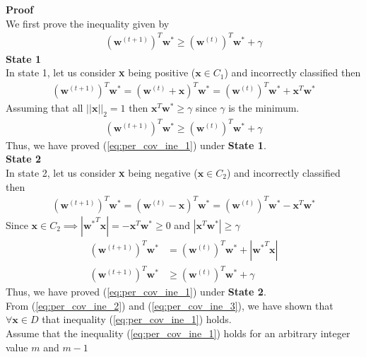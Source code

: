 \textbf{Proof}\\
We first prove the inequality given by 
\begin{align}
  (\textbf{w}^ {(t+1)})^T\textbf{w}^{*} \geq (\textbf{w}^ {(t)})^T\textbf{w}^{*} + \gamma
  \label{eq:per_cov_ine_1}
\end{align}
\indent \textbf{State 1} \\
In state 1, let us consider \textbf{x} being positive ($\textbf{x} \in C_1$) and incorrectly classified then
\begin{align}
  \nonumber
  (\textbf{w}^ {(t+1)})^T\textbf{w}^{*} = (\textbf{w}^ {(t)} + \textbf{x})^T\textbf{w}^{*} =   (\textbf{w}^ {(t)})^T\textbf{w}^{*} + \textbf{x}^T\textbf{w}^{*}
\end{align}
Assuming that all $||\textbf{x}||_2 = 1$ then $\textbf{x}^T\textbf{w}^{*} \geq \gamma$ since $\gamma$ is the minimum. 
\begin{align}
  \label{eq:per_cov_ine_2}
  (\textbf{w}^ {(t+1)})^T\textbf{w}^{*} \geq (\textbf{w}^ {(t)})^T\textbf{w}^{*} + \gamma
\end{align}
Thus, we have proved (\ref{eq:per_cov_ine_1})  under \textbf{State 1}.\\
\indent \textbf{State 2} \\
In state 2, let us consider \textbf{x} being negative ($\textbf{x} \in C_2$) and incorrectly classified then
\begin{align}
  \nonumber
  (\textbf{w}^ {(t+1)})^T\textbf{w}^{*} = (\textbf{w}^ {(t)} - \textbf{x})^T\textbf{w}^{*} =   (\textbf{w}^ {(t)})^T\textbf{w}^{*} - \textbf{x}^T\textbf{w}^{*}
\end{align}
Since $\textbf{x} \in C_2 \implies |{\textbf{w}^*}^T\textbf{x}| = - \textbf{x}^T\textbf{w}^* \geq 0$ and $|\textbf{x}^T\textbf{w}^{*}| \geq \gamma$
\begin{align}
  \nonumber
  (\textbf{w}^ {(t+1)})^T\textbf{w}^{*} &= (\textbf{w}^ {(t)})^T\textbf{w}^{*} + |{\textbf{w}^*}^T\textbf{x}| \\
  \label{eq:per_cov_ine_3}
  (\textbf{w}^ {(t+1)})^T\textbf{w}^{*} &\geq (\textbf{w}^ {(t)})^T\textbf{w}^{*} + \gamma
\end{align}
Thus, we have proved (\ref{eq:per_cov_ine_1})  under \textbf{State 2}.\\
From (\ref{eq:per_cov_ine_2}) and (\ref{eq:per_cov_ine_3}), we have shown that $\forall \textbf{x}\in D$ that inequality (\ref{eq:per_cov_ine_1}) holds.\\
Assume that the inequality (\ref{eq:per_cov_ine_1}) holds for an arbitrary integer value $m$ and $m-1$
